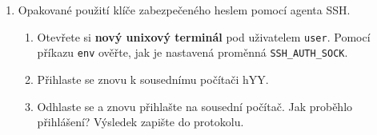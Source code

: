 \documentclass[a4paper,11pt]{article}
\begin{document}
\begin{enumerate}
    Nyní omezíme použití klíče uživatele {\tt root} pouze na spuštění konkrétního příkazu na vzdáleném počítači.
    \begin{enumerate}
    \item Přihlaste se jako uživatel {\tt root} na sousední počítač hYY, kam jste nakopírovali své veřejné klíče.
    \item Na vzdáleném počítači upravte soubor s autorizovanými veřejnými klíči tak, že na začátek řádku s klíčem uživatele {\tt root}\footnote{Řádek poznáte tak, že končí řetězcem {\tt <login>@root}.} přidáte příkaz 
        \verb|command="chronyc -n sources"| následova\-ný mezerou a původním obsahem řádku. Tento příkaz se spustí místo vzdáleného příhlášení. 
      \item Odhlaste se ze vzdáleného počítače.
      \item Znovu se přihlaste na sousední počítač hYY pomocí SSH z účtu {\tt root}. Výstup z terminálu po přihlášení zapište do protokolu.
    \end{enumerate}
  \item Opakované použití klíče zabezpečeného heslem pomocí agenta SSH.
    \begin{enumerate}
      \item Otevřete si \textbf{nový unixový terminál} pod uživatelem {\tt user}. Pomocí příkazu \verb|env| ověřte, jak je nastavená proměnná \verb|SSH_AUTH_SOCK|.
      \item Přihlaste se znovu k sousednímu počítači hYY.
      \item Odhlaste se a znovu přihlašte na sousední počítač. Jak proběhlo přihlášení? Výsledek zapište do protokolu.
    \end{enumerate}
\end{enumerate}
\end{document}
